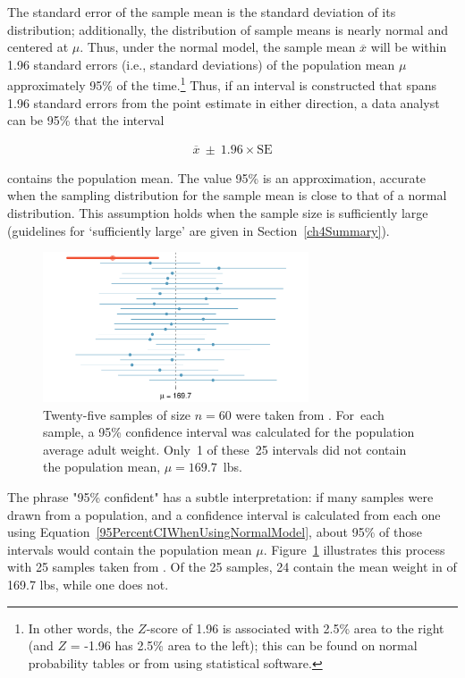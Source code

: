 The standard error of the sample mean is the standard deviation of its distribution; additionally, the distribution of sample means is nearly normal and centered at $\mu$. Thus, under the normal model, the sample mean $\overline{x}$ will be within 1.96 standard errors (i.e., standard deviations) of the population mean $\mu$ approximately 95\% of the time.\footnote{In other words, the $Z$-score of 1.96 is associated with 2.5\% area to the right (and $Z$ = -1.96 has 2.5\% area to the left); this can be found on normal probability tables or from using statistical software.} Thus, if an interval is constructed that spans 1.96 standard errors from the point estimate in either direction, a data analyst can be 95\%  that the interval

\begin{align}
  \overline{x}\ \pm\ 1.96\times \text{SE} 
\label{95PercentCIWhenUsingNormalModel}
\end{align}

contains the population mean. The value 95\% is an approximation, accurate when the sampling distribution for the sample mean is close to that of a normal distribution. This assumption holds when the sample size is sufficiently large (guidelines for `sufficiently large' are given in Section~\ref{ch4Summary}).

\begin{figure}[h!]
	\centering
	\includegraphics[width=0.70\textwidth]
	{ch_inference_foundations_oi_biostat/figures/95PercentConfidenceInterval/95PercentConfidenceInterval.pdf}
	\caption{Twenty-five samples of size $n=60$ were taken from . For~each sample, a 95\% confidence interval was calculated for the population average adult weight. Only~1 of these~25 intervals did not contain the population mean, $\mu = 169.7$~lbs.}
	\label{95PercentConfidenceInterval}
\end{figure}

The phrase "95\% confident" has a subtle interpretation: if many samples were drawn from a population, and a confidence interval is calculated from each one using Equation~\ref{95PercentCIWhenUsingNormalModel}, about 95\% of those intervals would contain the population mean $\mu$. Figure~\ref{95PercentConfidenceInterval} illustrates this process with 25 samples taken from . Of the 25 samples, 24 contain the mean weight in  of 169.7 lbs, while one does not. 

